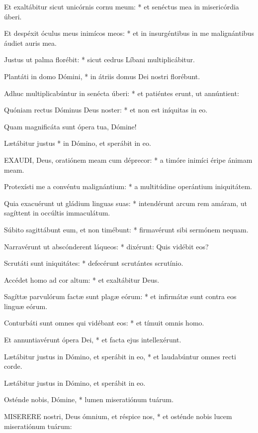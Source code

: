 Et exaltábitur sicut unicórnis cornu meum: * et senéctus mea in misericórdia úberi.

Et despéxit óculus meus inimícos meos: * et in insurgéntibus in me malignántibus áudiet auris mea.

Justus ut palma florébit: * sicut cedrus Líbani multiplicábitur.

Plantáti in domo Dómini, * in átriis domus Dei nostri florébunt.

Adhuc multiplicabúntur in senécta úberi: * et patiéntes erunt, ut annúntient:

Quóniam rectus Dóminus Deus noster: * et non est iníquitas in eo.

 Quam magnificáta sunt ópera tua, Dómine!

 Lætábitur justus * in Dómino, et sperábit in eo.


\lettrine[lines=2]{E}{XAUDI}, Deus, oratiónem meam cum déprecor: * a timóre inimíci éripe ánimam meam.

Protexísti me a convéntu malignántium: * a multitúdine operántium iniquitátem.

Quia exacuérunt ut gládium linguas suas: * intendérunt arcum rem amáram, ut sagíttent in occúltis immaculátum.

Súbito sagittábunt eum, et non timébunt: * firmavérunt sibi sermónem nequam.

Narravérunt ut abscónderent láqueos: * dixérunt: Quis vidébit eos?

Scrutáti sunt iniquitátes: * defecérunt scrutántes scrutínio.

Accédet homo ad cor altum: * et exaltábitur Deus.

Sagíttæ parvulórum factæ sunt plagæ eórum: * et infirmátæ sunt contra eos linguæ eórum.

Conturbáti sunt omnes qui vidébant eos: * et tímuit omnis homo.

Et annuntiavérunt ópera Dei, * et facta ejus intellexérunt.

Lætábitur justus in Dómino, et sperábit in eo, * et laudabúntur omnes recti corde.

 Lætábitur justus in Dómino, et sperábit in eo.

 Osténde nobis, Dómine, * lumen miseratiónum tuárum.


\lettrine[lines=2]{M}{ISERERE} nostri, Deus ómnium, et réspice nos, * et osténde nobis lucem miseratiónum tuárum:

